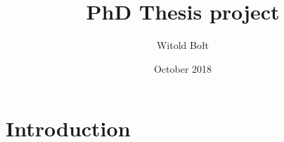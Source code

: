 \documentclass{article}
\title{PhD Thesis project}
\author{Witold Bołt}
\date{October 2018}
\begin{document}
\maketitle

\section{Introduction}
\end{document}
